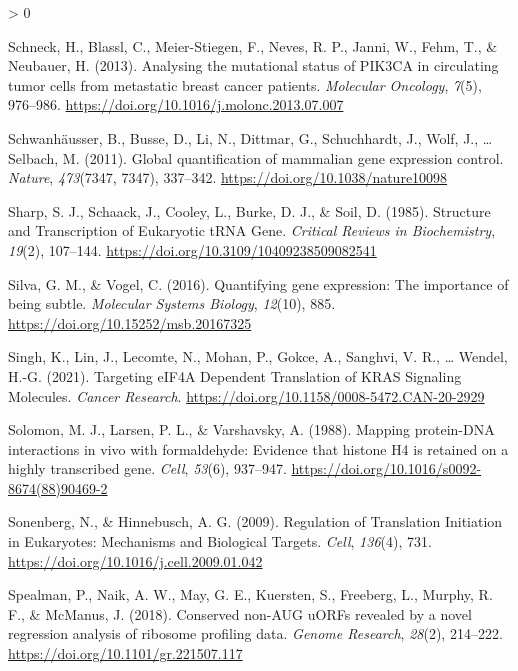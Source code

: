 \documentclass[
  12pt,
  openany]{book}
\newlength{\cslhangindent}
\newenvironment{CSLReferences}[2] %
 {%
  \setlength{\parindent}{0pt}
  \ifodd #1 \everypar{\setlength{\hangindent}{\cslhangindent}}\ignorespaces\fi
  \ifnum #2 > 0
  \setlength{\parskip}{#2\baselineskip}
  \fi
 }%
 {}
\begin{document}
\begin{CSLReferences}{1}{0}
\leavevmode\hypertarget{ref-Schneck2013}{}%
Schneck, H., Blassl, C., Meier-Stiegen, F., Neves, R. P., Janni, W., Fehm, T., \& Neubauer, H. (2013). Analysing the mutational status of {PIK3CA} in circulating tumor cells from metastatic breast cancer patients. \emph{Molecular Oncology}, \emph{7}(5), 976--986. \url{https://doi.org/10.1016/j.molonc.2013.07.007}

\leavevmode\hypertarget{ref-Schwanhausser2011}{}%
Schwanhäusser, B., Busse, D., Li, N., Dittmar, G., Schuchhardt, J., Wolf, J., \ldots{} Selbach, M. (2011). Global quantification of mammalian gene expression control. \emph{Nature}, \emph{473}(7347, 7347), 337--342. \url{https://doi.org/10.1038/nature10098}

\leavevmode\hypertarget{ref-Sharp1985}{}%
Sharp, S. J., Schaack, J., Cooley, L., Burke, D. J., \& Soil, D. (1985). Structure and {Transcription} of {Eukaryotic tRNA Gene}. \emph{Critical Reviews in Biochemistry}, \emph{19}(2), 107--144. \url{https://doi.org/10.3109/10409238509082541}

\leavevmode\hypertarget{ref-Silva2016}{}%
Silva, G. M., \& Vogel, C. (2016). Quantifying gene expression: The importance of being subtle. \emph{Molecular Systems Biology}, \emph{12}(10), 885. \url{https://doi.org/10.15252/msb.20167325}

\leavevmode\hypertarget{ref-Singh2021}{}%
Singh, K., Lin, J., Lecomte, N., Mohan, P., Gokce, A., Sanghvi, V. R., \ldots{} Wendel, H.-G. (2021). Targeting {eIF4A Dependent Translation} of {KRAS Signaling Molecules}. \emph{Cancer Research}. \url{https://doi.org/10.1158/0008-5472.CAN-20-2929}

\leavevmode\hypertarget{ref-Solomon1988}{}%
Solomon, M. J., Larsen, P. L., \& Varshavsky, A. (1988). Mapping protein-{DNA} interactions in vivo with formaldehyde: Evidence that histone {H4} is retained on a highly transcribed gene. \emph{Cell}, \emph{53}(6), 937--947. \url{https://doi.org/10.1016/s0092-8674(88)90469-2}

\leavevmode\hypertarget{ref-Sonenberg2009}{}%
Sonenberg, N., \& Hinnebusch, A. G. (2009). Regulation of {Translation Initiation} in {Eukaryotes}: {Mechanisms} and {Biological Targets}. \emph{Cell}, \emph{136}(4), 731. \url{https://doi.org/10.1016/j.cell.2009.01.042}

\leavevmode\hypertarget{ref-Spealman2018}{}%
Spealman, P., Naik, A. W., May, G. E., Kuersten, S., Freeberg, L., Murphy, R. F., \& McManus, J. (2018). Conserved non-{AUG uORFs} revealed by a novel regression analysis of ribosome profiling data. \emph{Genome Research}, \emph{28}(2), 214--222. \url{https://doi.org/10.1101/gr.221507.117}


\end{CSLReferences}
\end{document}
